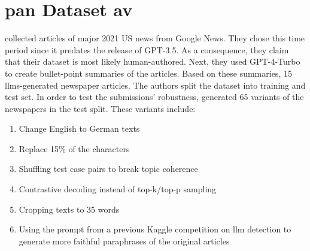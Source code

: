 \section{\acs{pan} Dataset \ac{av}}
\label{sec:pan_dataset_authorship_verification}

\citet{ayele_overview_2024} collected articles of major 2021 US news from Google News.
They chose this time period since it predates the release of GPT-3.5.
As a consequence, they claim that their dataset is most likely human-authored.
Next, they used GPT-4-Turbo to create bullet-point summaries of the articles. 
Based on these summaries, 15 \acp{llm}-generated newspaper articles.
The authors split the dataset into training and test set.
In order to test the submissions' robustness, \citet{ayele_overview_2024} generated 65 variants of the newspapers in the test split.
These variants include:
\begin{enumerate}
    \item Change English to German texts
    \item Replace 15\% of the characters
    \item Shuffling test case pairs to break topic coherence 
    \item Contrastive decoding instead of top-k/top-p sampling
    \item Cropping texts to 35 words
    \item Using the prompt from a previous Kaggle competition on \ac{llm} detection to generate more faithful paraphrases of the original articles
\end{enumerate}